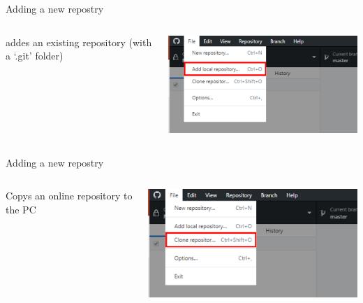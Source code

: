 \documentclass[10pt]{beamer}
\begin{document}
\begin{frame}[fragile]{Adding a new repostry}
  \begin{columns}[T]
    \begin{column}{.12\textwidth}
	\small addes an existing repository (with a `.git' folder)
    \end{column}
    \begin{column}{.88\textwidth}
	\includegraphics[width=10cm]{Figs/GHD/menu_03}
    \end{column}
  \end{columns}
\end{frame}

\begin{frame}[fragile]{Adding a new repostry}
  \begin{columns}[T]
    \begin{column}{.12\textwidth}
	\small Copys an online repository to the PC
    \end{column}
    \begin{column}{.88\textwidth}
	\includegraphics[width=10cm]{Figs/GHD/menu_04}
    \end{column}
  \end{columns}
\end{frame}
\end{document}
